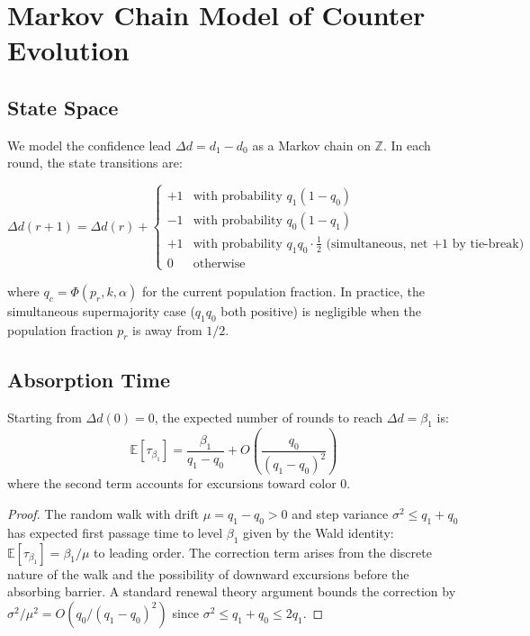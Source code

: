 \section{Markov Chain Model of Counter Evolution}

\label{sec:markov}

\subsection{State Space}

We model the confidence lead $\Delta d = d_1 - d_0$ as a Markov chain on $\mathbb{Z}$.
In each round, the state transitions are:

\begin{equation}
\Delta d(r+1) = \Delta d(r) + \begin{cases}
+1 & \text{with probability } q_1(1 - q_0) \\
-1 & \text{with probability } q_0(1 - q_1) \\
+1 & \text{with probability } q_1 q_0 \cdot \frac{1}{2} \text{ (simultaneous, net +1 by tie-break)} \\
0 & \text{otherwise}
\end{cases}
\label{eq:markov}
\end{equation}

where $q_c = \Phi(p_r, k, \alpha)$ for the current population fraction. In practice,
the simultaneous supermajority case ($q_1 q_0$ both positive) is negligible when the
population fraction $p_r$ is away from $1/2$.

\subsection{Absorption Time}

\begin{lemma}
\label{lem:absorption}
Starting from $\Delta d(0) = 0$, the expected number of rounds to reach $\Delta d = \beta_1$
is:
\[
\mathbb{E}[\tau_{\beta_1}] = \frac{\beta_1}{q_1 - q_0} + O\left(\frac{q_0}{(q_1 - q_0)^2}\right)
\]
where the second term accounts for excursions toward color 0.
\end{lemma}

\begin{proof}
The random walk with drift $\mu = q_1 - q_0 > 0$ and step variance $\sigma^2 \leq q_1 + q_0$
has expected first passage time to level $\beta_1$ given by the Wald identity:
$\mathbb{E}[\tau_{\beta_1}] = \beta_1 / \mu$ to leading order. The correction term
arises from the discrete nature of the walk and the possibility of downward excursions
before the absorbing barrier. A standard renewal theory argument bounds the correction
by $\sigma^2/\mu^2 = O(q_0/(q_1 - q_0)^2)$ since $\sigma^2 \leq q_1 + q_0 \leq 2q_1$.
\end{proof}

